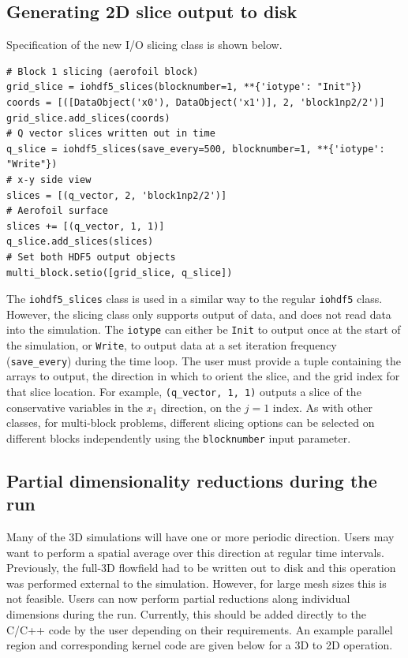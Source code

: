 \documentclass[11pt]{article}
\begin{document}
\subsection{Generating 2D slice output to disk}
Specification of the new I/O slicing class is shown below.
\begin{lstlisting}
# Block 1 slicing (aerofoil block)
grid_slice = iohdf5_slices(blocknumber=1, **{'iotype': "Init"})
coords = [([DataObject('x0'), DataObject('x1')], 2, 'block1np2/2')]
grid_slice.add_slices(coords)
# Q vector slices written out in time
q_slice = iohdf5_slices(save_every=500, blocknumber=1, **{'iotype': "Write"})
# x-y side view
slices = [(q_vector, 2, 'block1np2/2')]
# Aerofoil surface
slices += [(q_vector, 1, 1)]
q_slice.add_slices(slices)
# Set both HDF5 output objects
multi_block.setio([grid_slice, q_slice])
\end{lstlisting}
The \verb|iohdf5_slices| class is used in a similar way to the regular \verb|iohdf5| class. However, the slicing class only supports output of data, and does not read data into the simulation. The \verb|iotype| can either be \verb|Init| to output once at the start of the simulation, or \verb|Write|, to output data at a set iteration frequency (\verb|save_every|) during the time loop. The user must provide a tuple containing the arrays to output, the direction in which to orient the slice, and the grid index for that slice location. For example, \verb|(q_vector, 1, 1)| outputs a slice of the conservative variables in the $x_1$ direction, on the $j=1$ index. As with other classes, for multi-block problems, different slicing options can be selected on different blocks independently using the \verb|blocknumber| input parameter.

\subsection{Partial dimensionality reductions during the run}
Many of the 3D simulations will have one or more periodic direction. Users may want to perform a spatial average over this direction at regular time intervals. Previously, the full-3D flowfield had to be written out to disk and this operation was performed external to the simulation. However, for large mesh sizes this is not feasible. Users can now perform partial reductions along individual dimensions during the run. Currently, this should be added directly to the C/C++ code by the user depending on their requirements. An example parallel region and corresponding kernel code are given below for a 3D to 2D operation.
\end{document}
